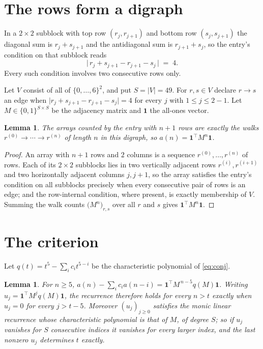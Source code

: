 \documentclass[11pt,a4paper]{article}
\theoremstyle{plain}
\newtheorem{lemma}[theorem]{Lemma}
\theoremstyle{definition}
\begin{document}
\section{The rows form a digraph}

In a $2\times2$ subblock with top row $(r_j,r_{j+1})$ and bottom row $(s_j,s_{j+1})$ the
diagonal sum is $r_j+s_{j+1}$ and the antidiagonal sum is $r_{j+1}+s_j$, so the entry's
condition on that subblock reads
\[
\bigl|\,r_j+s_{j+1}-r_{j+1}-s_j\,\bigr|\;=\;4.
\]
Every such condition involves two consecutive rows only.

Let $V$ consist of all of $\{0,\dots,6\}^{2}$, and put $S=|V|=49$. For $r,s\in V$ declare $r\to s$ an edge
when $\bigl|r_j+s_{j+1}-r_{j+1}-s_j\bigr|=4$ for every $j$ with
$1\le j\le2-1$. Let $M\in\{0,1\}^{S\times S}$ be the adjacency matrix and $\mathbf{1}$
the all-ones vector.

\begin{lemma}\label{lem:walk}
The arrays counted by the entry with $n+1$ rows are exactly the walks
$r^{(0)}\to\cdots\to r^{(n)}$ of length $n$ in this digraph, so
$a(n)=\mathbf{1}^{\!\top}M^{n}\mathbf{1}$.
\end{lemma}

\begin{proof}
An array with $n+1$ rows and $2$ columns is a sequence $r^{(0)},\dots,r^{(n)}$ of
rows. Each of its $2\times2$ subblocks lies in two vertically adjacent rows
$r^{(i)},r^{(i+1)}$ and two horizontally adjacent columns $j,j+1$, so the array satisfies
the entry's condition on all subblocks precisely when every consecutive pair of rows is an
edge; and the row-internal condition, where present, is exactly membership of $V$. Summing
the walk counts $\bigl(M^{n}\bigr)_{r,s}$ over all $r$ and $s$ gives
$\mathbf{1}^{\!\top}M^{n}\mathbf{1}$.
\end{proof}

\section{The criterion}

Let $q(t)=t^{5}-\sum_i c_i t^{5-i}$ be the characteristic polynomial of
\eqref{eq:conj}.

\begin{lemma}\label{lem:crit}
For $n\ge5$,
$a(n)-\sum_i c_i a(n-i)=\mathbf{1}^{\!\top}M^{\,n-5}q(M)\mathbf{1}$. Writing
$u_j=\mathbf{1}^{\!\top}M^{j}q(M)\mathbf{1}$, the recurrence therefore holds for every
$n>t$ exactly when $u_j=0$ for every $j>t-5$. Moreover $(u_j)_{j\ge0}$ satisfies the
monic linear recurrence whose characteristic polynomial is that of $M$, of degree $S$; so
if $u_j$ vanishes for $S$ consecutive indices it vanishes for every larger index, and the
last nonzero $u_j$ determines $t$ exactly.
\end{lemma}
\end{document}
